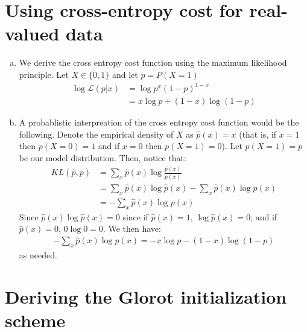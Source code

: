 \documentclass[paper=a4, fontsize=11pt]{scrartcl} %
\numberwithin{equation}{section} %
\numberwithin{figure}{section} %
\numberwithin{table}{section} %
\begin{document}
\section{Using cross-entropy cost for real-valued data}
\begin{enumerate}[(a)]
	\item We derive the cross entropy cost function using the maximum likelihood principle. Let $X\in\{0,1\}$ and let $p = P(X=1)$
	\begin{align*}
	\log \mathcal{L}(p|x) &= \log p^x(1-p)^{1-x}\\
	&= x\log p + (1-x)\log(1-p)
	\end{align*}
	\item A probablistic interpreation of the cross entropy cost function would be the following. Denote the empirical density of $X$ as $\hat{p}(x)=x$ (that is, if $x=1$ then $p(X=0)=1$ and if $x=0$ then $p(X=1)=0$). Let $p(X=1)=p$ be our model distribution. Then, notice that:
	\begin{align*}
	KL(\hat{p},p) &= \sum_{x}\hat{p}(x)\log\frac{\hat{p}(x)}{p(x)}\\
	&= \sum_{x}\hat{p}(x)\log\hat{p}(x) - \sum_{x}\hat{p}(x)\log p(x)\\
	&= - \sum_{x}\hat{p}(x)\log p(x)
	\end{align*}
	Since $\hat{p}(x)\log\hat{p}(x) = 0$ since if $\hat{p}(x)=1$, $\log\hat{p}(x)=0$; and if $\hat{p}(x)=0$, $0\log 0 = 0$. We then have:
	\begin{align*}
	- \sum_{x}\hat{p}(x)\log p(x) = -x\log p -(1-x)\log(1-p)
	\end{align*}
	as needed.
\end{enumerate}

\section{Deriving the Glorot initialization scheme}
\end{document}
